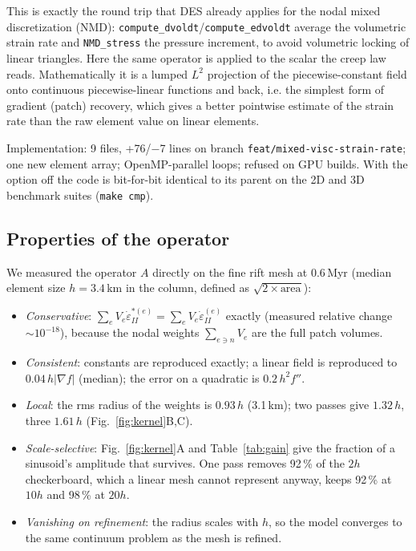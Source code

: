 \documentclass[11pt]{article}
\newcommand{\edot}{\dot\varepsilon_{II}}
\newcommand{\code}[1]{\texttt{#1}}
\begin{document}
This is exactly the round trip that DES already applies for the nodal mixed discretization (NMD):
\code{compute\_dvoldt}/\code{compute\_edvoldt} average the volumetric strain rate and
\code{NMD\_stress} the pressure increment, to avoid volumetric locking of linear triangles. Here
the same operator is applied to the scalar the creep law reads. Mathematically it is a lumped
$L^2$ projection of the piecewise-constant field onto continuous piecewise-linear functions and
back, i.e. the simplest form of gradient (patch) recovery, which gives a better pointwise
estimate of the strain rate than the raw element value on linear elements.

Implementation: 9 files, +76/$-$7 lines on branch \code{feat/mixed-visc-strain-rate}; one new
element array; OpenMP-parallel loops; refused on GPU builds. With the option off the code is
bit-for-bit identical to its parent on the 2D and 3D benchmark suites (\code{make cmp}).

\subsection{Properties of the operator}
We measured the operator $A$ directly on the fine rift mesh at 0.6\,Myr (median element size
$h=3.4$\,km in the column, defined as $\sqrt{2\times\text{area}}$):
\begin{itemize}
\item \emph{Conservative}: $\sum_eV_e\edot^{*(e)}=\sum_eV_e\edot^{(e)}$ exactly (measured
  relative change $\sim10^{-18}$), because the nodal weights $\sum_{e\ni n}V_e$ are the full
  patch volumes.
\item \emph{Consistent}: constants are reproduced exactly; a linear field is reproduced to
  $0.04\,h|\nabla f|$ (median); the error on a quadratic is $0.2\,h^2f''$.
\item \emph{Local}: the rms radius of the weights is $0.93\,h$ (3.1\,km); two passes give
  $1.32\,h$, three $1.61\,h$ (Fig.~\ref{fig:kernel}B,C).
\item \emph{Scale-selective}: Fig.~\ref{fig:kernel}A and Table~\ref{tab:gain} give the fraction of
  a sinusoid's amplitude that survives. One pass removes 92\,\% of the $2h$ checkerboard, which a
  linear mesh cannot represent anyway, keeps 92\,\% at $10h$ and 98\,\% at $20h$.
\item \emph{Vanishing on refinement}: the radius scales with $h$, so the model converges to the
  same continuum problem as the mesh is refined.
\end{itemize}
\end{document}
